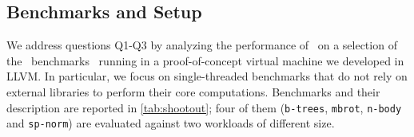\begin{description}
\ifauthorea{\newline}{}

\subsection{Benchmarks and Setup}
\label{ss:bench-setup}
We address questions Q1-Q3 by analyzing the performance of \osrkit\ on a selection of the \shootout\ benchmarks~\cite{shootout} running in a proof-of-concept virtual machine we developed in LLVM. In particular, we focus on single-threaded benchmarks that do not rely on external libraries to perform their core computations. Benchmarks and their description are reported in \mytable\ref{tab:shootout}; four of them ({\tt b-trees}, {\tt mbrot}, {\tt n-body} and {\tt sp-norm}) are evaluated against two workloads of different size.





\end{description}
